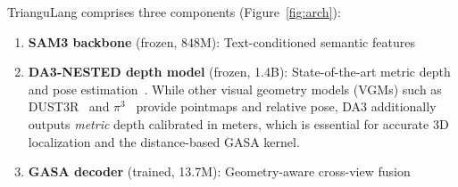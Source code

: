 
TrianguLang comprises three components (Figure~\ref{fig:arch}):
\begin{enumerate}[nosep,leftmargin=*]
    \item \textbf{SAM3 backbone} (frozen, 848M): Text-conditioned semantic features
    \item \textbf{DA3-NESTED depth model} (frozen, 1.4B): State-of-the-art metric depth and pose estimation~\cite{da3}. While other visual geometry models (VGMs) such as DUST3R~\cite{dust3r} and $\pi^3$~\cite{pi3} provide pointmaps and relative pose, DA3 additionally outputs \emph{metric} depth calibrated in meters, which is essential for accurate 3D localization and the distance-based GASA kernel.
    \item \textbf{GASA decoder} (trained, 13.7M): Geometry-aware cross-view fusion
\end{enumerate}




